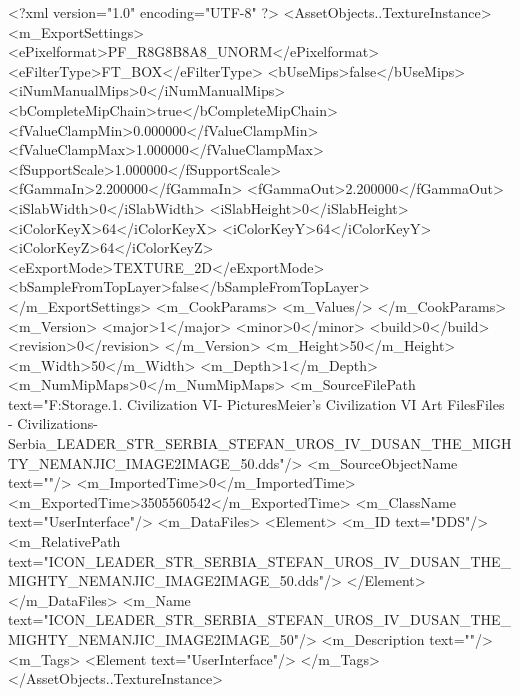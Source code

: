 <?xml version="1.0" encoding="UTF-8" ?>
<AssetObjects..TextureInstance>
	<m_ExportSettings>
		<ePixelformat>PF_R8G8B8A8_UNORM</ePixelformat>
		<eFilterType>FT_BOX</eFilterType>
		<bUseMips>false</bUseMips>
		<iNumManualMips>0</iNumManualMips>
		<bCompleteMipChain>true</bCompleteMipChain>
		<fValueClampMin>0.000000</fValueClampMin>
		<fValueClampMax>1.000000</fValueClampMax>
		<fSupportScale>1.000000</fSupportScale>
		<fGammaIn>2.200000</fGammaIn>
		<fGammaOut>2.200000</fGammaOut>
		<iSlabWidth>0</iSlabWidth>
		<iSlabHeight>0</iSlabHeight>
		<iColorKeyX>64</iColorKeyX>
		<iColorKeyY>64</iColorKeyY>
		<iColorKeyZ>64</iColorKeyZ>
		<eExportMode>TEXTURE_2D</eExportMode>
		<bSampleFromTopLayer>false</bSampleFromTopLayer>
	</m_ExportSettings>
	<m_CookParams>
		<m_Values/>
	</m_CookParams>
	<m_Version>
		<major>1</major>
		<minor>0</minor>
		<build>0</build>
		<revision>0</revision>
	</m_Version>
	<m_Height>50</m_Height>
	<m_Width>50</m_Width>
	<m_Depth>1</m_Depth>
	<m_NumMipMaps>0</m_NumMipMaps>
	<m_SourceFilePath text="F:\Mod Storage\2.1. Civilization VI\Mods\Archive - Pictures\Sid Meier's Civilization VI Art Files\Art Files - Civilizations\Civilization - Serbia\ICON_LEADER_STR_SERBIA_STEFAN_UROS_IV_DUSAN_THE_MIGHTY_NEMANJIC_IMAGE2IMAGE_50.dds"/>
	<m_SourceObjectName text=""/>
	<m_ImportedTime>0</m_ImportedTime>
	<m_ExportedTime>3505560542</m_ExportedTime>
	<m_ClassName text="UserInterface"/>
	<m_DataFiles>
		<Element>
			<m_ID text="DDS"/>
			<m_RelativePath text="ICON_LEADER_STR_SERBIA_STEFAN_UROS_IV_DUSAN_THE_MIGHTY_NEMANJIC_IMAGE2IMAGE_50.dds"/>
		</Element>
	</m_DataFiles>
	<m_Name text="ICON_LEADER_STR_SERBIA_STEFAN_UROS_IV_DUSAN_THE_MIGHTY_NEMANJIC_IMAGE2IMAGE_50"/>
	<m_Description text=""/>
	<m_Tags>
		<Element text="UserInterface"/>
	</m_Tags>
</AssetObjects..TextureInstance>

